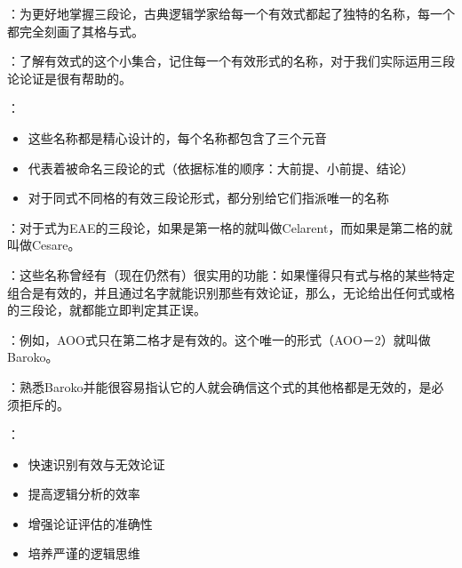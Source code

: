 \begin{theorembox}[title=古典命名系统的设计原理]
：为更好地掌握三段论，古典逻辑学家给每一个有效式都起了独特的名称，每一个都完全刻画了其格与式。

：了解有效式的这个小集合，记住每一个有效形式的名称，对于我们实际运用三段论论证是很有帮助的。

：
\begin{itemize}
  \item 这些名称都是精心设计的，每个名称都包含了三个元音
  \item 代表着被命名三段论的式（依据标准的顺序：大前提、小前提、结论）
  \item 对于同式不同格的有效三段论形式，都分别给它们指派唯一的名称
\end{itemize}

：对于式为EAE的三段论，如果是第一格的就叫做Celarent，而如果是第二格的就叫做Cesare。\cite{lukasiewicz1957}
\end{theorembox}

\begin{examplebox}[title=命名系统的实用功能]
：这些名称曾经有（现在仍然有）很实用的功能：如果懂得只有式与格的某些特定组合是有效的，并且通过名字就能识别那些有效论证，那么，无论给出任何式或格的三段论，就都能立即判定其正误。

：例如，AOO式只在第二格才是有效的。这个唯一的形式（AOO－2）就叫做Baroko。\cite{copi1980}

：熟悉Baroko并能很容易指认它的人就会确信这个式的其他格都是无效的，是必须拒斥的。

：
\begin{itemize}
  \item 快速识别有效与无效论证
  \item 提高逻辑分析的效率
  \item 增强论证评估的准确性
  \item 培养严谨的逻辑思维
\end{itemize}
\end{examplebox}

